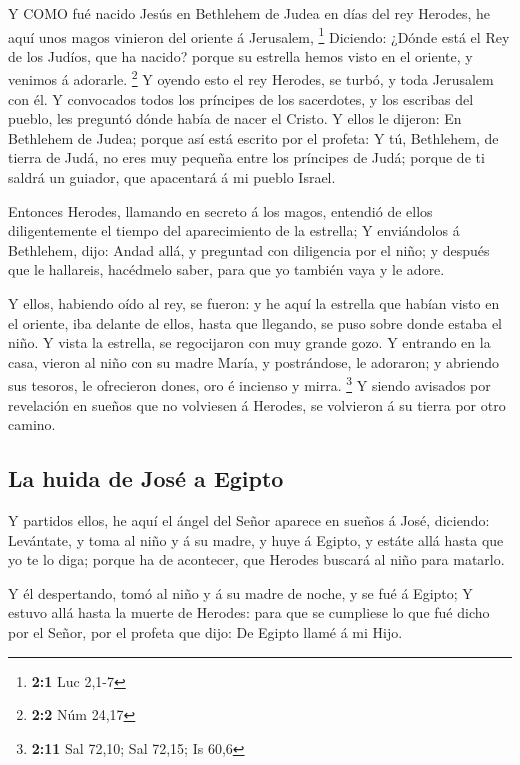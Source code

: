  Y COMO fué nacido Jesús en Bethlehem de Judea en días del
rey Herodes, he aquí unos magos vinieron del oriente á Jerusalem,
\footnote{\textbf{2:1} Luc 2,1-7}  Diciendo: ¿Dónde está el
Rey de los Judíos, que ha nacido? porque su estrella hemos visto en el
oriente, y venimos á adorarle. \footnote{\textbf{2:2} Núm 24,17}
 Y oyendo esto el rey Herodes, se turbó, y toda Jerusalem
con él.  Y convocados todos los príncipes de los sacerdotes,
y los escribas del pueblo, les preguntó dónde había de nacer el Cristo.
 Y ellos le dijeron: En Bethlehem de Judea; porque así está
escrito por el profeta:  Y tú, Bethlehem, de tierra de Judá,
no eres muy pequeña entre los príncipes de Judá; porque de ti saldrá un
guiador, que apacentará á mi pueblo Israel.

 Entonces Herodes, llamando en secreto á los magos, entendió
de ellos diligentemente el tiempo del aparecimiento de la estrella;
 Y enviándolos á Bethlehem, dijo: Andad allá, y preguntad
con diligencia por el niño; y después que le hallareis, hacédmelo saber,
para que yo también vaya y le adore.

 Y ellos, habiendo oído al rey, se fueron: y he aquí la
estrella que habían visto en el oriente, iba delante de ellos, hasta que
llegando, se puso sobre donde estaba el niño.  Y vista la
estrella, se regocijaron con muy grande gozo.  Y entrando
en la casa, vieron al niño con su madre María, y postrándose, le
adoraron; y abriendo sus tesoros, le ofrecieron dones, oro é incienso y
mirra. \footnote{\textbf{2:11} Sal 72,10; Sal 72,15; Is 60,6}
 Y siendo avisados por revelación en sueños que no
volviesen á Herodes, se volvieron á su tierra por otro camino.

\hypertarget{la-huida-de-josuxe9-a-egipto}{%
\subsection{La huida de José a
Egipto}\label{la-huida-de-josuxe9-a-egipto}}

 Y partidos ellos, he aquí el ángel del Señor aparece en
sueños á José, diciendo: Levántate, y toma al niño y á su madre, y huye
á Egipto, y estáte allá hasta que yo te lo diga; porque ha de acontecer,
que Herodes buscará al niño para matarlo.

 Y él despertando, tomó al niño y á su madre de noche, y se
fué á Egipto;  Y estuvo allá hasta la muerte de Herodes:
para que se cumpliese lo que fué dicho por el Señor, por el profeta que
dijo: De Egipto llamé á mi Hijo.

